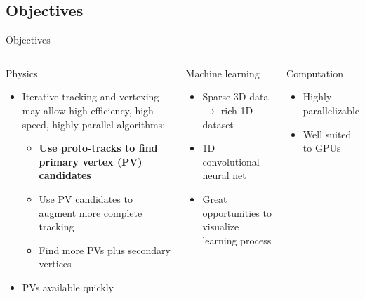 \subsection{Objectives}
\begin{frame}{Objectives}
\begin{columns}[c]
    \begin{block}{Physics}
    \begin{itemize}
        \item Iterative tracking and vertexing may allow high efficiency, high speed, highly parallel algorithms:
        \begin{itemize}
            \item {\bf Use proto-tracks to find primary vertex (PV) candidates}
            \item Use PV candidates to augment more complete tracking
            \item Find more PVs plus secondary vertices
        \end{itemize}
        \item PVs available quickly
    \end{itemize}
    \end{block}
    \begin{block}{Machine learning}
    \begin{itemize}
        \item Sparse 3D data $\to$ rich 1D dataset
        \item 1D convolutional neural net
        \item Great opportunities to visualize learning process
    \end{itemize}
    \end{block}
    
    \begin{block}{Computation}
    \begin{itemize}
        \item Highly parallelizable
        \item Well suited to GPUs
    \end{itemize}
    \end{block}
\end{columns}


\end{frame}

